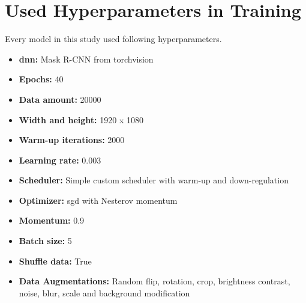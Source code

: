 \chapter{Used Hyperparameters in Training}
\label{appendix:hyperparameter}
	Every model in this study used following hyperparameters.

	\begin{itemize}
		\item \textbf{\ac{dnn}:} Mask R-CNN from torchvision
		\item \textbf{Epochs:} 40
		\item \textbf{Data amount:} 20000
		\item \textbf{Width and height:} 1920 x 1080
		\item \textbf{Warm-up iterations:} 2000
		\item \textbf{Learning rate:} 0.003
		\item \textbf{Scheduler:} Simple custom scheduler with warm-up and down-regulation
		\item \textbf{Optimizer:} \acl{sgd} with Nesterov momentum \cite{Botev2016}
		\item \textbf{Momentum:} 0.9
		\item \textbf{Batch size:} 5
		\item \textbf{Shuffle data:} True
		\item \textbf{Data Augmentations:} Random flip, rotation, crop, brightness contrast, noise, blur, scale and background modification
	\end{itemize}